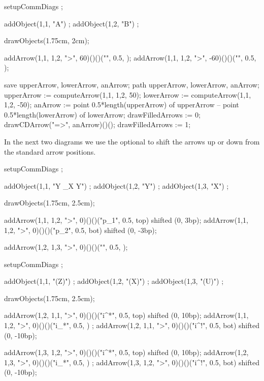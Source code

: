 \startbuffer
\startformula{}
  setupCommDiags ;
  
  addObject(1,1, "A") ;
  addObject(1,2, "B") ;
  
  drawObjects(1.75cm, 2cm);
  
  addArrow(1,1, 1,2, ">",  60)()()("", 0.5, );
  addArrow(1,1, 1,2, ">", -60)()()("", 0.5, );
  
  save upperArrow, lowerArrow, anArrow;
  path upperArrow, lowerArrow, anArrow;
  upperArrow := computeArrow(1,1, 1,2,  50);
  lowerArrow := computeArrow(1,1, 1,2, -50);
  anArrow    := 
    point 0.5*length(upperArrow) of upperArrow --
    point 0.5*length(lowerArrow) of lowerArrow;
  drawFilledArrows := 0;
  drawCDArrow("=>", anArrow)()();
  drawFilledArrows := 1;
\stopMPcode\stopformula
\stopbuffer

\processTEXbuffer

\typebuffer

In the next two diagrams we use the optional  
to shift the arrows up or down from the standard arrow positions. 

\startbuffer
\startformula{}
  setupCommDiags ;
  
  addObject(1,1, "Y \times_X Y") ;
  addObject(1,2, "Y") ;
  addObject(1,3, "X") ;
    
  drawObjects(1.75cm, 2.5cm);
  
  addArrow(1,1, 1,2, ">", 0)()()("p_1", 0.5, top) shifted (0, 3bp);
  addArrow(1,1, 1,2, ">", 0)()()("p_2", 0.5, bot) shifted (0, -3bp);
  
  addArrow(1,2, 1,3, ">", 0)()()("", 0.5, );
\stopMPcode\stopformula
\stopbuffer

\processTEXbuffer

\typebuffer

\blank[2*big]

\startbuffer
\startformula{}
  setupCommDiags ;
  
  addObject(1,1, "(Z)") ;
  addObject(1,2, "(X)") ;
  addObject(1,3, "(U)") ;
    
  drawObjects(1.75cm, 2.5cm);
  
  addArrow(1,2, 1,1, ">", 0)()()("i^*", 0.5, top) shifted (0, 10bp);
  addArrow(1,1, 1,2, ">", 0)()()("i_*", 0.5,    ) ;
  addArrow(1,2, 1,1, ">", 0)()()("i^!", 0.5, bot) shifted (0, -10bp);
  
  addArrow(1,3, 1,2, ">", 0)()()("i^*", 0.5, top) shifted (0, 10bp);
  addArrow(1,2, 1,3, ">", 0)()()("i_*", 0.5,    ) ;
  addArrow(1,3, 1,2, ">", 0)()()("i^!", 0.5, bot) shifted (0, -10bp);
\stopMPcode\stopformula
\stopbuffer

